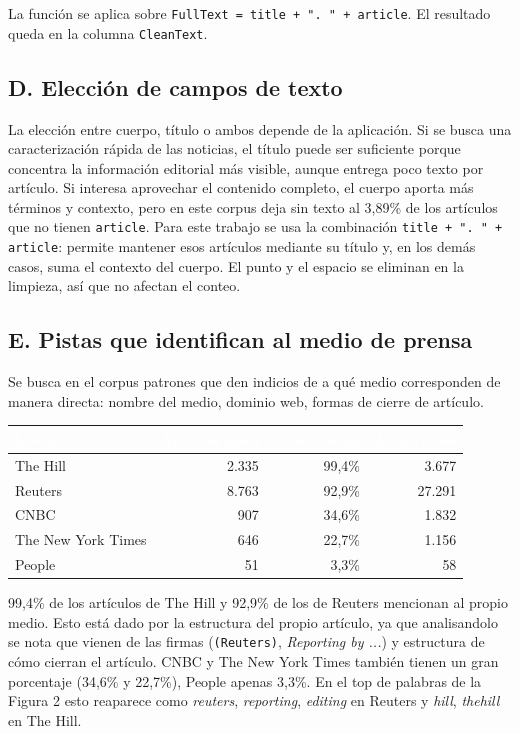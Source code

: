 \documentclass[a4paper,11pt]{article}
\newcommand{\hd}[1]{\textbf{\textcolor{white}{#1}}}
\newcommand{\filaCabecera}{\rowcolor{azulOscuro}}
\begin{document}
La función se aplica sobre \texttt{FullText = title + ". " + article}. El resultado queda en la columna \texttt{CleanText}.

\subsection{D. Elección de campos de texto}

La elección entre cuerpo, título o ambos depende de la aplicación. Si se busca una caracterización rápida de las noticias, el título puede ser suficiente porque concentra la información editorial más visible, aunque entrega poco texto por artículo. Si interesa aprovechar el contenido completo, el cuerpo aporta más términos y contexto, pero en este corpus deja sin texto al 3,89\% de los artículos que no tienen \texttt{article}. Para este trabajo se usa la combinación \texttt{title + ". " + article}: permite mantener esos artículos mediante su título y, en los demás casos, suma el contexto del cuerpo. El punto y el espacio se eliminan en la limpieza, así que no afectan el conteo.

\subsection{E. Pistas que identifican al medio de prensa}

Se busca en el corpus patrones que den indicios de a qué medio corresponden de manera directa: nombre del medio, dominio web, formas de cierre de artículo.

\begin{center}
\begin{tabular}{lrrr}
\toprule
\filaCabecera \hd{Medio} & \hd{Art. con pista} & \hd{\% del medio} & \hd{Apariciones}\\
\midrule
The Hill           & 2.335 & 99,4\% & 3.677 \\
Reuters            & 8.763 & 92,9\% & 27.291 \\
CNBC               &   907 & 34,6\% &  1.832 \\
The New York Times &   646 & 22,7\% &  1.156 \\
People             &    51 &  3,3\% &     58 \\
\bottomrule
\end{tabular}
\end{center}

99,4\% de los artículos de The Hill y 92,9\% de los de Reuters mencionan al propio medio. Esto está dado por la estructura del propio artículo, ya que analisandolo se nota que vienen de las firmas (\texttt{(Reuters)}, \emph{Reporting by ...}) y estructura de cómo cierran el artículo. CNBC y The New York Times también tienen un gran porcentaje (34,6\% y 22,7\%), People apenas 3,3\%. En el top de palabras de la Figura 2 esto reaparece como \emph{reuters}, \emph{reporting}, \emph{editing} en Reuters y \emph{hill}, \emph{thehill} en The Hill.
\end{document}
